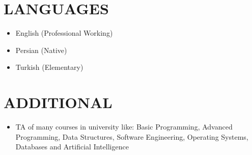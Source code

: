 \documentclass[11pt,a4paper,roman]{moderncv}        %
\begin{document}
  \section{LANGUAGES}\label{sec:languages}
  \begin{minipage}{\maincolumnwidth}%
    \small{
      \begin{itemize}
        \item English (Professional Working)
        \item Persian (Native)
        \item Turkish (Elementary)
      \end{itemize}}%
  \end{minipage}%

  \section{ADDITIONAL}\label{sec:additional}
  \begin{minipage}{\maincolumnwidth}%
    \small{
      \begin{itemize}
        \item TA of many courses in university like: Basic Programming, Advanced Programming, Data Structures, Software Engineering, Operating Systems, Databases and Artificial Intelligence
      \end{itemize}}%
  \end{minipage}%
\end{document}
